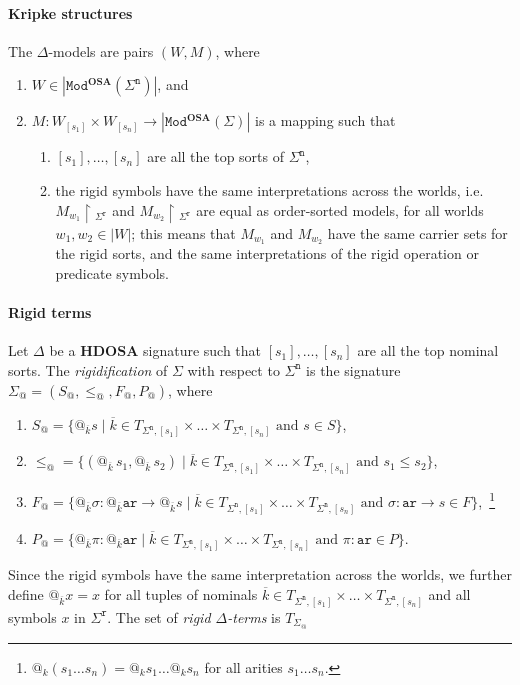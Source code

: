 \documentclass{article}
\makeatletter
\newcommand{\OSA}{{\mathbf{OSA}}}
\newcommand{\HDOSA}{{\mathbf{HDOSA}}}
\newcommand{\Mod}{\mathtt{Mod}}
\newcommand{\red}{\!\upharpoonright\!}
\newcommand{\ari}{\mathtt{ar}}
\newcommand{\rigid}{\mathtt{r}}
\newcommand{\nom}{\mathtt{n}}
\newcommand{\ok}{{\overline k}}
\newcommand{\at}[1]{@_{#1}\,}
\makeatother
\begin{document}
\paragraph{Kripke structures}
The $\Delta$-models are pairs $(W,M)$, where
\begin{enumerate}
\item $W\in|\Mod^\OSA(\Sigma^\nom)|$, and 
\item $M\colon W_{[s_1]}\times W_{[s_n]}\to|\Mod^\OSA(\Sigma)|$ is a mapping such that 
\begin{enumerate}
 \item $[s_1],\dots,[s_n]$ are all the top sorts of $\Sigma^\nom$,
 \item the rigid symbols have the same interpretations across the worlds, i.e. ${M_{w_1}\red_{\Sigma^\rigid}}$ and ${M_{w_2}\red_{\Sigma^\rigid}}$ are equal as order-sorted models, for all worlds $w_1,w_2\in|W|$; 
 this means that \(M_{w_{1}}\) and \(M_{w_{2}}\) have the same carrier sets for the rigid sorts, and the same interpretations of the rigid operation or predicate symbols.
 \end{enumerate}
\end{enumerate}

\paragraph{Rigid terms} 
 Let $\Delta$ be a $\HDOSA$ signature such that $[s_1],\dots,[s_n]$ are all the top nominal sorts.
 The \emph{rigidification} of $\Sigma$ with respect to $\Sigma^\nom$ is the signature $\Sigma_@=(S_@,\leq_@,F_@,P_@)$, where 
 \begin{enumerate}
 \item $S_@=\{@_{\overline{k}} s \mid \overline{k}\in T_{\Sigma^\nom,[s_1]}\times\dots\times T_{\Sigma^\nom,[s_n]} \mbox{ and } s\in S\}$,
 
 \item $\leq_@=\{ (\at{\overline{k}}s_1,\at{\overline{k}}s_2 ) \mid \overline{k}\in T_{\Sigma^\nom,[s_1]}\times\dots\times T_{\Sigma^\nom,[s_n]} \mbox{ and } s_1\leq s_2  \}$,
 
 \item $F_@=\{@_{\overline{k}}\sigma\colon @_{\overline{k}}\ari \to @_{\overline{k}} s \mid \ok\in T_{\Sigma^\nom,[s_1]}\times\dots\times T_{\Sigma^\nom,[s_n]} \mbox{ and } \sigma\colon \ari\to s \in F \}$,~\footnote{$@_k (s_1\ldots s_n)=@_k s_1\ldots@_k s_n$ for all arities $s_1\ldots s_n$.}
 
 \item $P_@=\{@_\ok \pi\colon @_\ok \ari \mid \ok\in T_{\Sigma^\nom,[s_1]}\times\dots\times T_{\Sigma^\nom,[s_n]} \mbox{ and } \pi\colon\ari\in P\}$.
 \end{enumerate}
 Since the rigid symbols have the same interpretation across the worlds, we further define $@_\ok x=x$ for all tuples of nominals $\ok\in T_{\Sigma^\nom,[s_1]}\times\dots\times T_{\Sigma^\nom,[s_n]}$ and all symbols $x$ in $\Sigma^\rigid$.
 The set of \emph{rigid $\Delta$-terms} is $T_{\Sigma_@}$
\end{document}
